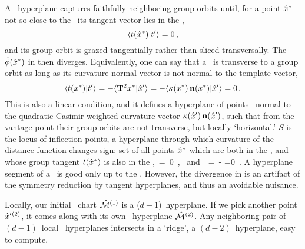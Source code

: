 A \slice\ hyperplane captures faithfully neighboring group orbits until,
for a point $\hat{x}^\ast$ not so close to the \template\ its tangent vector
lies in the \slice,
\[
\braket{\groupTan(\sspRSing)}{\sliceTan{}}= 0
\,,
\]
and its group orbit is grazed tangentially rather than sliced transversally.
The {\phaseVel} $\dot{{\bf \phi}}(\hat{x}^\ast)$ in
 then diverges. Equivalently,
one can say that a \slice\ is transverse to a group orbit as long as its
curvature normal vector  is not normal to the template vector,
\[
\braket{\groupTan(\sspSing)}{\sliceTan{}}
 =
-\braket{\Lg^2\sspSing}{\slicep}
 =
-\braket{\kappa(\sspSing) \,{\bf n}(\sspSing)}{\slicep}
 = 0
\,.
\]
This is also a linear condition, and it defines a hyperplane of points
\sspSing\ normal to  the quadratic Casimir-weighted curvature vector
$\kappa({\hat{x}'}) \, {\bf n}({\hat{x}'})$, such that from the {\template} vantage
point their group orbits are not transverse, but locally `horizontal.'
{\Sset} $S$ is the locus of inflection points, a hyperplane through which
curvature of the distance function changes sign:
set of all points
$\hat{x}^\ast$ which are both in the {\slice}, and whose group tangent
$t(\hat{x}^\ast)$ is also in the  {\slice},
\beq
\braket{\sspRSing}{\sliceTan{}} \,=\, 0
    \,, \mbox{ and }
\braket{\groupTan(\sspRSing)}{\sliceTan{}}
 \,=\,
-
 =0
\,.
\label{sliceSingl0}
\eeq
A hyperplane segment of a \slice\ is good only up to the \sset. However,
the divergence in {\phaseVel}  is an artifact of
the symmetry reduction by tangent hyperplanes, and thus an avoidable
nuisance.

Locally, our initial \slice\ chart $\hat{\cal M}{}^{(1)}$ is a ($d\!-\!1$)\dmn\ hyperplane.
If
we pick another {\template} point ${\hat{x}'}{}^{(2)}$, it comes along with
its own \slice\ hyperplane $\hat{\cal M}{}^{(2)}$.
Any neighboring pair of
$(d\!-\!1)$\dmn\ local \slice\ hyperplanes intersects in a `ridge',
a $(d\!-\!2)$\dmn\ hyperplane, easy to compute.

